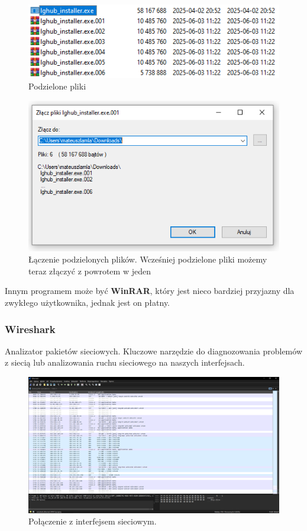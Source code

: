 \documentclass[0.82pt,a4paper]{article}
\begin{document}
    \begin{figure}[H]
        \centering
        \includegraphics[width=0.8\linewidth]{media/7zip/9_podzielone_pliki.PNG}
        \caption[]{Podzielone pliki}
        \label{fig:7z_podzielone_pliki}
    \end{figure}

    \begin{figure}[H]
        \centering
        \includegraphics[width=0.8\linewidth]{media/7zip/10_zlaczanie_podzielonych_plikow.PNG}
        \caption[]{Łączenie podzielonych plików. Wcześniej podzielone pliki możemy teraz złączyć z powrotem w jeden}
        \label{fig:7z_laczenie_podzielonych_plikow}
    \end{figure}
    
    Innym programem może być \textbf{WinRAR}, który jest nieco bardziej przyjazny dla zwykłego użytkownika, jednak jest on płatny.
\newpage
\subsubsection{Wireshark}
    Analizator pakietów sieciowych. Kluczowe narzędzie do diagnozowania problemów z siecią lub analizowania ruchu sieciowego na naszych interfejsach.

    \begin{figure}[H]
        \centering
        \includegraphics[width=0.8\linewidth]{media/Wireshark/wireshark1.PNG}
        \caption[wireshark glowne]{Połączenie z interfejsem sieciowym.}
        \label{fig:wire_polaczenie}
    \end{figure}
\end{document}
